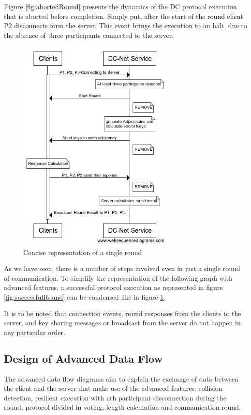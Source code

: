 Figure \ref{fig:abortedRound} presents the dynamics of the DC protocol execution that is aborted before completion. Simply put, after the start of the round client P2 disconnects form the server. This event brings the execution to an halt, due to the absence of three participants connected to the server. 


\begin{figure}[H]
    \centering
    \includegraphics[width=0.7\textwidth]{Images/Design/singleRoundCondensed.png}
    \caption{Concise representation of a single round }
    \label{fig:singleRoundCondensed}
\end{figure}

As we have seen, there is a number of steps involved even in just a single round of communication. To simplify the representation of the following graph with advanced features, a successful protocol execution as represented in figure \ref{fig:successfulRound} can be condensed like in figure \ref{fig:singleRoundCondensed}.

It is to be noted that connection events, round responses from the clients to the server, and key sharing messages or broadcast from the server do not happen in any particular order.



\subsection{Design of Advanced Data Flow}
The advanced data flow diagrams aim to explain the exchange of data between the client and the server that make use of the advanced features: collision detection, resilient execution with nth participant disconnection during the round, protocol divided in voting, length-calculation and communication round.

